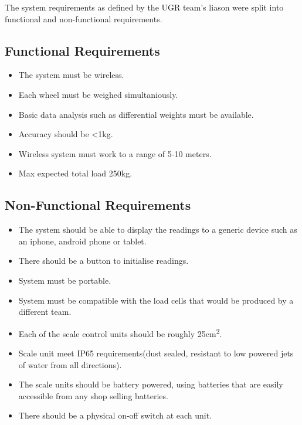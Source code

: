 The system requirements as defined by the UGR team's liason were split into functional and non-functional requirements.

\subsection{Functional Requirements}
\label{functional}
\begin{itemize}
\item The system must be wireless.
\item Each wheel must be weighed simultaniously.
\item Basic data analysis such as differential weights must be available.
\item Accuracy should be \textless 1kg.
\item Wireless system must work to a range of 5-10 meters.
\item Max expected total load 250kg.
\end{itemize}

\subsection{Non-Functional Requirements}
\label{non-functional}
\begin{itemize}
\item The system should be able to display the readings to a generic device such as an iphone, android phone or tablet. 
\item There should be a button to initialise readings.
\item System must be portable.
\item System must be compatible with the load cells that would be produced by a different team.
\item Each of the scale control units should be roughly 25cm\textsuperscript{2}.
\item Scale unit meet IP65 requirements(dust sealed, resistant to low powered jets of water from all directions).
\item The scale units should be battery powered, using batteries that are easily accessible from any shop selling batteries.
\item There should be a physical on-off switch at each unit.
\end{itemize}

